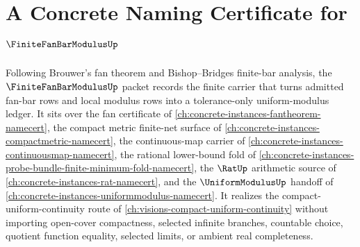 \chapter{A Concrete Naming Certificate for $\FiniteFanBarModulusUp$}
\label{ch:concrete-instances-finite-fan-bar-modulus-namecert}

Following Brouwer's fan theorem and Bishop--Bridges finite-bar analysis, the $\FiniteFanBarModulusUp$ packet records the finite carrier that turns admitted fan-bar rows and local modulus rows into a tolerance-only uniform-modulus ledger. It sits over the fan certificate of \autoref{ch:concrete-instances-fantheorem-namecert}, the compact metric finite-net surface of \autoref{ch:concrete-instances-compactmetric-namecert}, the continuous-map carrier of \autoref{ch:concrete-instances-continuousmap-namecert}, the rational lower-bound fold of \autoref{ch:concrete-instances-probe-bundle-finite-minimum-fold-namecert}, the $\RatUp$ arithmetic source of \autoref{ch:concrete-instances-rat-namecert}, and the $\UniformModulusUp$ handoff of \autoref{ch:concrete-instances-uniformmodulus-namecert}. It realizes the compact-uniform-continuity route of \autoref{ch:visions-compact-uniform-continuity} without importing open-cover compactness, selected infinite branches, countable choice, quotient function equality, selected limits, or ambient real completeness.

